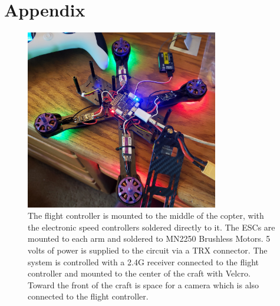 \documentclass[11pt]{ucthesis}
\begin{document}
\nocite{*}


\appendix

\chapter{Appendix}
\vspace{-1cm}
\begin{figure}[H]
	\centering
	\includegraphics[width=0.75\textwidth]{20200322_154331crop}
	\caption[Internal Circuitry ]{The flight controller is mounted to the middle of the copter, with the electronic speed controllers soldered directly to it. The ESCs are mounted to each arm and soldered to MN2250 Brushless Motors. 5 volts of power is supplied to the circuit via a TRX connector. The system is controlled with a 2.4G receiver connected to the flight controller and mounted to the center of the craft with Velcro. Toward the front of the craft is space for a camera which is also connected to the flight controller.}
	\label{fig:wizard2}
\end{figure}
\vspace{3cm}
\end{document}
